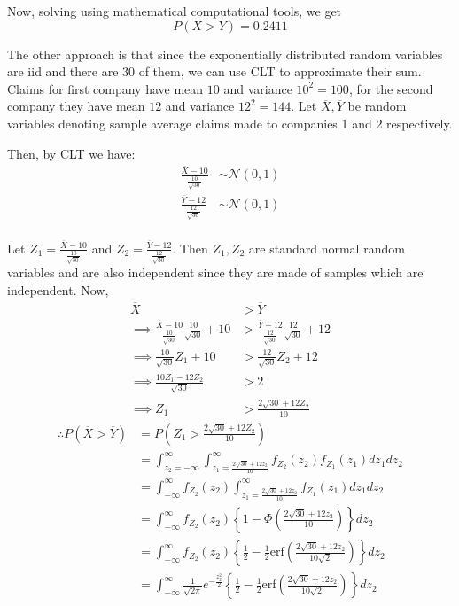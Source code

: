 \documentclass[12pt, oneside]{article}
\begin{document}
\begin{enumerate}
{  Now, solving using mathematical computational tools, we get
  \begin{equation}
    P(X > Y) = 0.2411 \label{eq:1}
  \end{equation}

  The other approach is that since the exponentially distributed random variables are
  iid and there are 30 of them, we can use CLT to approximate their sum. Claims for
  first company have mean \(10\) and variance \(10^2 = 100\), for the second company
  they have mean \(12\) and variance \(12^2 = 144\). Let \(\overline{X}, \overline{Y}\) be random variables
  denoting sample average claims made to companies 1 and 2 respectively.

  Then, by CLT we have:
  \begin{align*}
    \frac{\overline{X} - 10}{\frac{10}{\sqrt{30}}} &\sim \mathcal{N}(0, 1) \\
    \frac{\overline{Y} - 12}{\frac{12}{\sqrt{30}}} &\sim \mathcal{N}(0, 1) \\
  \end{align*}

  Let \(Z_1 = \frac{\overline{X} - 10}{\frac{10}{\sqrt{30}}}\) and \(Z_2 = \frac{\overline{Y} - 12}{\frac{12}{\sqrt{30}}}\).
  Then \(Z_1, Z_2\) are standard normal random variables and are also independent since
  they are made of samples which are independent. Now,
  \begin{align*}
    \overline{X} &> \overline{Y} \\
    \implies \frac{\overline{X} - 10}{\frac{10}{\sqrt{30}}} \frac{10}{\sqrt{30}} + 10 &> \frac{\overline{Y} - 12}{\frac{12}{\sqrt{30}}} \frac{12}{\sqrt{30}} + 12 \\
    \implies {\frac{10}{\sqrt{30}}} Z_1 + 10 &> \frac{12}{\sqrt{30}} Z_2 + 12 \\
    \implies \frac{10Z_1 - 12Z_2}{\sqrt{30}} &> 2 \\
    \implies Z_1 &> \frac{2\sqrt{30} + 12Z_2}{10}
  \end{align*}
  \begin{align*}
    \therefore P(\overline{X} > \overline{Y}) &= P\left(Z_1 > \frac{2\sqrt{30} + 12Z_2}{10}\right) \\
      &= \int_{z_2=-\infty}^{\infty} \int_{z_1 = \frac{2\sqrt{30} + 12z_2}{10}}^{\infty} f_{Z_2}(z_2) f_{Z_1}(z_1) dz_1 dz_2 \\
      &= \int_{-\infty}^{\infty} f_{Z_2}(z_2) \int_{z_1 = \frac{2\sqrt{30} + 12z_2}{10}}^{\infty}  f_{Z_1}(z_1) dz_1 dz_2 \\
      &= \int_{-\infty}^{\infty} f_{Z_2}(z_2) \left\{1 - \Phi\left(\frac{2\sqrt{30} + 12z_2}{10}\right)\right\} dz_2 \tag*{(where \(\Phi\) is the standard normal CDF)} \\
      &= \int_{-\infty}^{\infty} f_{Z_2}(z_2) \left\{\frac{1}{2} - \frac{1}{2}\text{erf}\left(\frac{2\sqrt{30} + 12z_2}{10\sqrt{2}}\right)\right\} dz_2
          \tag*{(Where erf is the Gauss error function)} \\
      &= \int_{-\infty}^{\infty} \frac{1}{\sqrt{2\pi}} e^{-\frac{z_2^2}{2}} \left\{\frac{1}{2} - \frac{1}{2}\text{erf}\left(\frac{2\sqrt{30} + 12z_2}{10\sqrt{2}}\right)\right\} dz_2
  \end{align*}

}
\end{enumerate}
\end{document}
